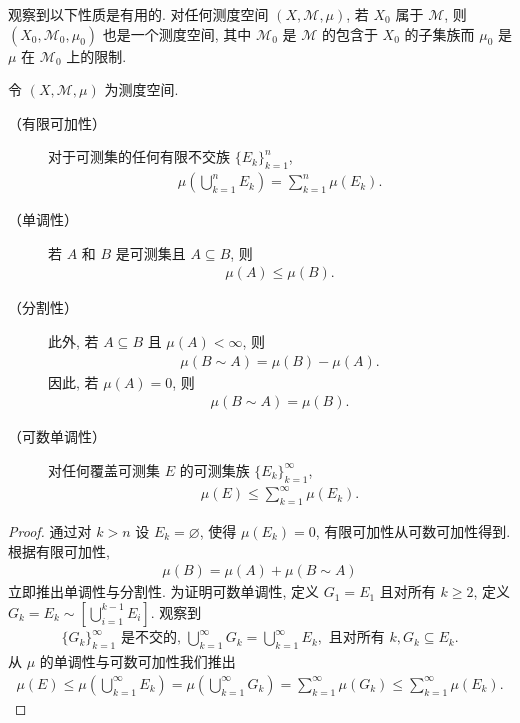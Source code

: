 \documentclass[../../main.tex]{subfiles}
\begin{document}
观察到以下性质是有用的. 对任何测度空间 $(X,\mathcal{M},\mu)$, 若 $X_{0}$ 属于 $\mathcal{M}$, 则 $(X_{0},\mathcal{M}_{0},\mu_{0})$ 也是一个测度空间, 其中 $\mathcal{M}_{0}$ 是 $\mathcal{M}$ 的包含于 $X_{0}$ 的子集族而 $\mu_{0}$ 是 $\mu$ 在 $\mathcal{M}_{0}$ 上的限制.

\begin{proposition}\label{proposition:ch17-basic-properties}
令 $(X,\mathcal{M},\mu)$ 为测度空间.
\begin{description}
\item[（有限可加性）] 对于可测集的任何有限不交族 $\{E_{k}\}_{k=1}^{n}$,
\begin{align*}
\mu\left(\bigcup_{k=1}^{n}E_{k}\right)=\sum_{k=1}^{n}\mu(E_{k}).
\end{align*}
\item[（单调性）] 若 $A$ 和 $B$ 是可测集且 $A\subseteq B$, 则
\begin{align*}
\mu(A)\leqslant\mu(B).
\end{align*}
\item[（分割性）] 此外, 若 $A\subseteq B$ 且 $\mu(A)<\infty$, 则
\begin{align*}
\mu(B\sim A)=\mu(B)-\mu(A).
\end{align*}
因此, 若 $\mu(A)=0$, 则
\begin{align*}
\mu(B\sim A)=\mu(B).
\end{align*}
\item[（可数单调性）] 对任何覆盖可测集 $E$ 的可测集族 $\{E_{k}\}_{k=1}^{\infty}$,
\begin{align*}
\mu(E)\leqslant\sum_{k=1}^{\infty}\mu(E_{k}).
\end{align*}
\end{description}
\end{proposition}

\begin{proof}
通过对 $k>n$ 设 $E_{k}=\varnothing$, 使得 $\mu(E_{k})=0$, 有限可加性从可数可加性得到. 根据有限可加性,
\begin{align*}
\mu(B)=\mu(A)+\mu(B\sim A)
\end{align*}
立即推出单调性与分割性. 为证明可数单调性, 定义 $G_{1}=E_{1}$ 且对所有 $k\geqslant 2$, 定义 $G_{k}=E_{k}\sim\left[\bigcup_{i=1}^{k-1}E_{i}\right]$. 观察到
\begin{align*}
\{G_{k}\}_{k=1}^{\infty}\text{ 是不交的, }\bigcup_{k=1}^{\infty}G_{k}=\bigcup_{k=1}^{\infty}E_{k},\text{ 且对所有 }k,G_{k}\subseteq E_{k}.
\end{align*}
从 $\mu$ 的单调性与可数可加性我们推出
\begin{align*}
\mu(E)\leqslant\mu\left(\bigcup_{k=1}^{\infty}E_{k}\right)=\mu\left(\bigcup_{k=1}^{\infty}G_{k}\right)=\sum_{k=1}^{\infty}\mu(G_{k})\leqslant\sum_{k=1}^{\infty}\mu(E_{k}).
\end{align*}
\end{proof}
\end{document}

